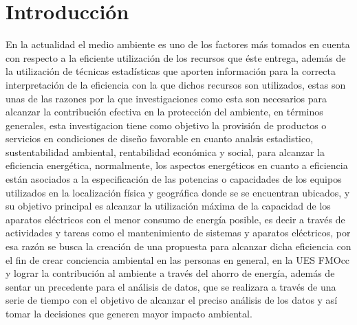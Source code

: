 \documentclass[12pt,letterpaper]{report}
\begin{document}
\chapter*{Introducción}
En la actualidad el medio ambiente es uno de los factores más tomados en cuenta con respecto
a la eficiente utilización de los recursos que éste entrega, además de la utilización de técnicas
estadísticas que aporten información para la correcta interpretación de la eficiencia con la que
dichos recursos son utilizados, estas son unas de las razones por la que investigaciones como esta
son necesarios para alcanzar la contribución efectiva en la protección del ambiente, en
términos generales, esta investigacion tiene como objetivo la provisión de productos o servicios
en condiciones de diseño favorable en cuanto analsis estadistico, sustentabilidad
ambiental, rentabilidad económica y social, para alcanzar la eficiencia energética,
normalmente, los aspectos energéticos en cuanto a eficiencia están asociados a la especificación de
las potencias o capacidades de los equipos utilizados en la localización física y geográfica
donde se se encuentran ubicados, y su objetivo principal es alcanzar la utilización máxima de la
capacidad de los aparatos eléctricos con el menor consumo de energía posible, es decir a
través de actividades y tareas como el mantenimiento de sistemas y aparatos eléctricos, por esa
razón se busca la creación de una propuesta para alcanzar dicha eficiencia con el
fin de crear conciencia ambiental en las personas en general, en la UES FMOcc y lograr la
contribución al ambiente a través del ahorro de energía, además de sentar un precedente para
el análisis de datos, que se realizara a través de una serie de tiempo con el objetivo de alcanzar
el preciso análisis de los datos y así tomar la decisiones que generen mayor impacto ambiental.
\end{document}
